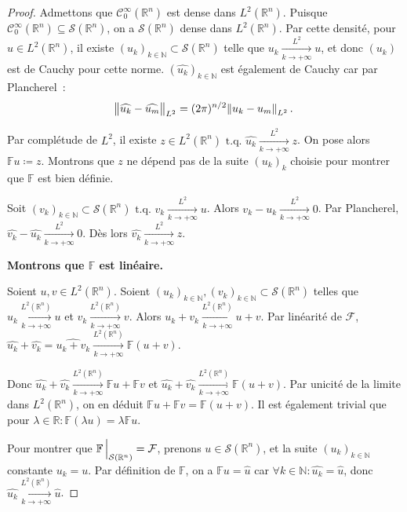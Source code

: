 \documentclass{report}
\newcommand{\R}{{\mathbb R}}
\newcommand{\N}{{\mathbb N}}
\newcommand{\tq}{\text{ t.q. }}
\newcommand{\pinfty}{{+\infty}}
\theoremstyle{definition}
\theoremstyle{remark}
\begin{document}
\begin{proof} Admettons que $\mathcal C_0^\infty(\R^n)$ est dense dans $L^2(\R^n)$. Puisque $\mathcal C_0^\infty(\R^n) \subseteq \mathcal S(\R^n)$, on a $\mathcal S(\R^n)$
dense dans $L^2(\R^n)$. Par cette densité, pour $u \in L^2(\R^n)$, il existe $(u_k)_{k \in \N} \subset \mathcal S(\R^n)$ telle que $u_k \xrightarrow[k \to \pinfty]{L^2} u$,
et donc $(u_k)$ est de Cauchy pour cette norme. $(\widehat {u_k})_{k \in \N}$ est également de Cauchy car par Plancherel~:
\[\norm {\widehat {u_k} - \widehat {u_m}}_{L^2} = (2\pi)^{n/2}\norm {u_k - u_m}_{L^2}.\]

Par complétude de $L^2$, il existe $z \in L^2(\R^n) \tq \widehat {u_k} \xrightarrow[k \to \pinfty]{L^2} z$. On pose alors $\mathbb Fu \coloneqq z$. Montrons que $z$ ne dépend pas
de la suite $(u_k)_k$ choisie pour montrer que $\mathbb F$ est bien définie.

Soit $(v_k)_{k \in \N} \subset \mathcal S(\R^n) \tq v_k \xrightarrow[k \to \pinfty]{L^2} u$. Alors $v_k-u_k \xrightarrow[k \to \pinfty]{L^2} 0$. Par Plancherel,
$\widehat {v_k}-\widehat {u_k} \xrightarrow[k \to \pinfty]{L^2} 0$. Dès lors $\widehat {v_k} \xrightarrow[k \to \pinfty]{L^2} z$.

\textbf{Montrons que $\mathbb F$ est linéaire.}

Soient $u, v \in L^2(\R^n)$. Soient $(u_k)_{k \in \N}, (v_k)_{k \in \N} \subset \mathcal S(\R^n)$ telles que $u_k \xrightarrow[k \to \pinfty]{L^2(\R^n)} u$ et
$v_k \xrightarrow[k \to \pinfty]{L^2(\R^n)} v$. Alors $u_k+v_k \xrightarrow[k \to \pinfty]{L^2(\R^n)} u+v$. Par linéarité de $\mathcal F$,
$\widehat {u_k} + \widehat {v_k} = \widehat {u_k + v_k} \xrightarrow[k \to \pinfty]{L^2(\R^n)} \mathbb F(u+v)$.

Donc $\widehat {u_k} + \widehat {v_k} \xrightarrow[k \to \pinfty]{L^2(\R^n)} \mathbb Fu + \mathbb Fv$ et
$\widehat {u_k} + \widehat {v_k} \xrightarrow[k \to \pinfty]{L^2(\R^n)} \mathbb F(u+v)$. Par unicité de la limite dans $L^2(\R^n)$, on en déduit
$\mathbb F u + \mathbb F v = \mathbb F(u+v)$. Il est également trivial que pour $\lambda \in \R : \mathbb F(\lambda u) = \lambda \mathbb Fu$.

Pour montrer que $\mathbb F\sVert[2]_{\mathcal S(\R^n)} = \mathcal F$, prenons $u \in \mathcal S(\R^n)$, et la suite $(u_k)_{k \in \N}$ constante $u_k = u$.
Par définition de $\mathbb F$, on a $\mathbb Fu = \hat u$ car $\forall k \in \N : \widehat {u_k} = \hat u$, donc $\widehat {u_k} \xrightarrow[k \to \pinfty]{L^2(\R^n)} \hat u$.


\end{proof}
\end{document}
